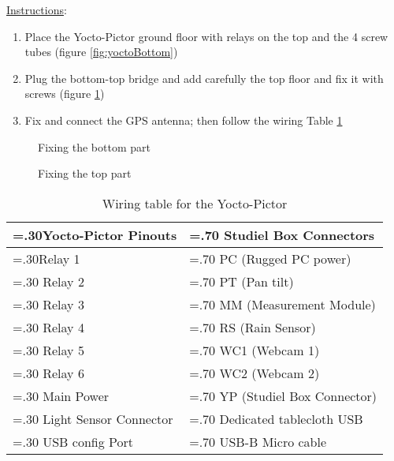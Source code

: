 \underline{Instructions}:
\begin{enumerate}
	\item Place the Yocto-Pictor ground floor with relays on the top 
		and the 4 screw tubes (figure \ref{fig:yoctoBottom})
	\item Plug the bottom-top bridge and add carefully the top floor 
		and fix it with screws (figure \ref{fig:yoctoTop})
	\item Fix and connect the GPS antenna; then follow the wiring Table \ref{table:yoctoWire}
\end{enumerate}

\begin{figure}[!ht]
  \centering
  \begin{minipage}[b]{0.49\textwidth}
	  \caption{Fixing the bottom part}
	\label{fig:yoctoBottom}
  \end{minipage}
  \hfill
  \begin{minipage}[b]{0.49\textwidth}
	  \caption{Fixing the top part}
	\label{fig:yoctoTop}
  \end{minipage}
\end{figure}


 \begin{table}[h]
	\begin{tabularx}{\textwidth} {| >{\hsize=.30\hsize}X| >{\hsize=.70\hsize}X| }
		\hline
		\textbf{Yocto-Pictor Pinouts} & \textbf{Studiel Box Connectors} \\
		\hline
		\hline
		Relay 1 & PC  (Rugged PC power) \\ \hline
		Relay 2 & PT  (Pan tilt) \\ \hline
		Relay 3 & MM  (Measurement Module) \\ \hline
		Relay 4 & RS  (Rain Sensor) \\ \hline
		Relay 5 & WC1 (Webcam 1) \\ \hline
		Relay 6 & WC2 (Webcam 2) \\ \hline
		Main Power &  YP (Studiel Box Connector) \\ \hline
		Light Sensor Connector & Dedicated tablecloth USB  \\ \hline
		USB config Port & USB-B Micro cable \\ \hline
	\end{tabularx}
	\caption{Wiring table for the Yocto-Pictor}
	 \label{table:yoctoWire}
\end{table}

